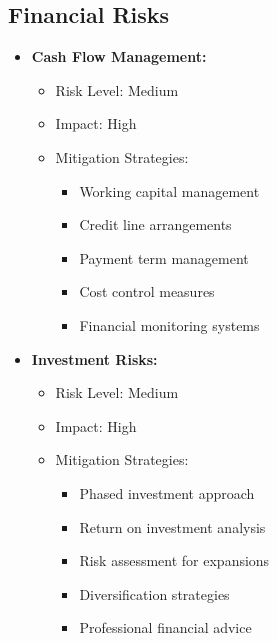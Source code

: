 \subsection{Financial Risks}
\begin{itemize}
    \item \textbf{Cash Flow Management:}
    \begin{itemize}
        \item Risk Level: Medium
        \item Impact: High
        \item Mitigation Strategies:
        \begin{itemize}
            \item Working capital management
            \item Credit line arrangements
            \item Payment term management
            \item Cost control measures
            \item Financial monitoring systems
        \end{itemize}
    \end{itemize}
    
    \item \textbf{Investment Risks:}
    \begin{itemize}
        \item Risk Level: Medium
        \item Impact: High
        \item Mitigation Strategies:
        \begin{itemize}
            \item Phased investment approach
            \item Return on investment analysis
            \item Risk assessment for expansions
            \item Diversification strategies
            \item Professional financial advice
        \end{itemize}
    \end{itemize}
\end{itemize}

